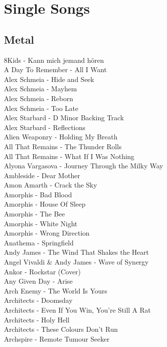 \cleardoublepage
\chapter{Single Songs}\label{singles}

\section{Metal}

8Kids - Kann mich jemand hören\\
A Day To Remember - All I Want\\
Alex Schmeia - Hide and Seek\\
Alex Schmeia - Mayhem\\
Alex Schmeia - Reborn\\
Alex Schmeia - Too Late\\
Alex Starbard - D Minor Backing Track\\
Alex Starbard - Reflections\\
Alien Weaponry - Holding My Breath\\
All That Remains - The Thunder Rolls\\
All That Remains - What If I Was Nothing\\
Alyona Vargasova - Journey Through the Milky Way\\
Ambleside - Dear Mother\\
Amon Amarth - Crack the Sky\\
Amorphis - Bad Blood\\
Amorphis - House Of Sleep\\
Amorphis - The Bee\\
Amorphis - White Night\\
Amorphis - Wrong Direction\\
Anathema - Springfield\\
Andy James - The Wind That Shakes the Heart\\
Angel Vivaldi \& Andy James - Wave of Synergy\\
Ankor - Rockstar (Cover)\\
Any Given Day - Arise\\
Arch Enemy - The World Is Yours\\
Architects - Doomsday\\
Architects - Even If You Win, You're Still A Rat\\
Architects - Holy Hell\\
Architects - These Colours Don't Run\\
Archspire - Remote Tumour Seeker\\
